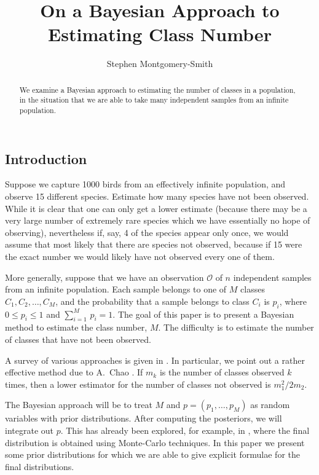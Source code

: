 \documentclass{amsart}
\title{On a Bayesian Approach to Estimating Class Number}
\author{Stephen Montgomery-Smith}
\begin{document}
\begin{abstract}
We examine a Bayesian approach to estimating the number of classes in
a population, in the situation that
we are able to take many independent samples from an
infinite population.\end{abstract}

\maketitle

\subsection*{Introduction}

Suppose we capture 1000 birds from an
effectively infinite population, and
observe 15 different species.  Estimate how many species have not been
observed.  While it is clear that one can only get a lower
estimate (because there may be a very large number of extremely rare species
which we have essentially no hope of observing), nevertheless if, say,
4 of the species appear only once, we would assume that most likely that
there are species not observed, because if 15 were the exact number
we would likely have not observed every one of them.

More generally, suppose that we have an observation $\mathcal O$
of $n$ independent samples from
an infinite population.  
Each sample belongs to one of $M$ classes $C_1,C_2,\dots,C_M$, 
and the probability that a sample belongs to
class $C_i$ is $p_i$, where
$0\le p_i\le 1$ and $\sum_{i=1}^M\,p_i =1$.
The goal of this paper is to present a Bayesian method to 
estimate the class number, $M$.
The difficulty is to estimate the number of classes that have not been
observed.

A survey of various approaches is given in \cite{chao05}.  In particular, we point
out a
rather effective method due to A.~Chao \cite{chao84}.  If
$m_k$ is the number of classes observed $k$ times, 
then a lower estimator for the number of 
classes not observed is $m_1^2/2m_2$.

The Bayesian approach will be to treat $M$ and $p = (p_1,\dots,p_M)$
as random variables with prior distributions.
After computing the posteriors, we will integrate out $p$.
This has already been explored, for example, in \cite{rodrigues et al},
where the final distribution is obtained using Monte-Carlo techniques.
In this paper we present some prior distributions for which
we are able to give explicit formulae for the final distributions.
\end{document}
